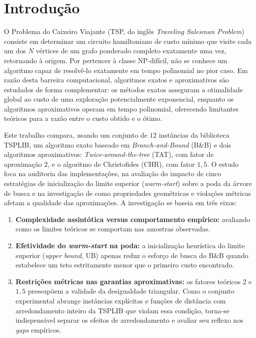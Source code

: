 \documentclass[12pt]{article}
\begin{document}
\section{Introdução}

O Problema do Caixeiro Viajante (TSP, do inglês \textit{Traveling Salesman Problem}) consiste em determinar um circuito hamiltoniano de custo mínimo que visite cada um dos $N$ vértices de um grafo ponderado completo exatamente uma vez, retornando à origem. Por pertencer à classe NP-difícil, não se conhece um algoritmo capaz de resolvê-lo exatamente em tempo polinomial no pior caso. Em razão desta barreira computacional, algoritmos exatos e aproximativos são estudados de forma complementar: os métodos exatos asseguram a otimalidade global ao custo de uma exploração potencialmente exponencial, enquanto os algoritmos aproximativos operam em tempo polinomial, oferecendo limitantes teóricos para a razão entre o custo obtido e o ótimo.

Este trabalho compara, usando um conjunto de $12$ instâncias da biblioteca TSPLIB, um algoritmo exato baseado em \textit{Branch-and-Bound} (B\&B) e dois algoritmos aproximativos: \textit{Twice-around-the-tree} (TAT), com fator de aproximação $2$, e o algoritmo de Christofides (CHR), com fator $1{,}5$. O estudo foca na auditoria das implementações, na avaliação do impacto de cinco estratégias de inicialização do limite superior (\textit{warm-start}) sobre a poda da árvore de busca e na investigação de como propriedades geométricas e violações métricas afetam a qualidade das aproximações. A investigação se baseia em três eixos:
\begin{enumerate}
    \item \textbf{Complexidade assintótica versus comportamento empírico:} avaliando como os limites teóricos se comportam nas amostras observadas.
    \item \textbf{Efetividade do \textit{warm-start} na poda:} a inicialização heurística do limite superior (\textit{upper bound}, UB) apenas reduz o esforço de busca do B\&B quando estabelece um teto estritamente menor que o primeiro custo encontrado.
    \item \textbf{Restrições métricas nas garantias aproximativas:} os fatores teóricos $2$ e $1{,}5$ pressupõem a validade da desigualdade triangular. Como o conjunto experimental abrange instâncias explícitas e funções de distância com arredondamento inteiro da TSPLIB que violam essa condição, torna-se indispensável separar os efeitos de arredondamento e avaliar seu reflexo nos \textit{gaps} empíricos.
\end{enumerate}
\end{document}
